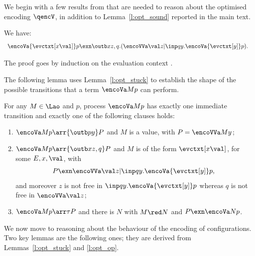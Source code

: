 \DSOCTb


We begin with  a few  results from \cite{DurierHS18,Durier20}
that are needed to reason about the  
optimised encoding $\qencV$, in addition to Lemma~\ref{l:opt_sound}
reported in the main text. 

\DSOCTe


\begin{lemma} 
\label{l:opt_stuck}
We have: 
$$
\begin{array}{rcl}
\encoVa {\evctxt[x\val]} p\exn \outb x {z,q}.(\encoVVa \val z|\inp q
y.\encoVa {\evctxt[y]}p).
\end{array}
 $$ 
\end{lemma}
\noindent
The proof \cite{DurierHS18,Durier20}
goes by induction on the evaluation context \evctxt.



The following lemma \cite{DurierHS18,Durier20}
uses Lemma~\ref{l:opt_stuck}  
to establish the shape of the possible transitions that a term 
$\encoVa M p $ can perform. 


\begin{lemma}
\label{l:opt_op}
For any
  $M\in\Lao$ and  $p$, process  $\encoVa M p$ has exactly
  one immediate transition and exactly one of the following clauses holds:
\begin{enumerate}
\item $\encoVa M p\arr{\outb py}P$  %
and $M$ is a value, with $P=\encoVVa M y$; %
\item $\encoVa M p\arr{\outb x {z,q}} P$  and %
 $M $ is of the form $\evctxt[x\val]$, for some $E,x,\val$,  with 
$$P\exn \encoVVa \val z|\inp q y.\encoVa {\evctxt[y]} p ,$$
and moreover $z$ is not free in $\inp q y.\encoVa {\evctxt[y]} p$
whereas $q$  is not free in $\encoVVa \val z$;
\item $\encoVa M p\arr\tau P$ and there is $N$  with $M\red N$ and
  $P\exn \encoVa N p$. 
\end{enumerate}
\end{lemma}
 
\noindent
We now move to reasoning about the behaviour of the encoding of configurations. 
Two key lemmas are the following ones; they are derived from Lemmas~\ref{l:opt_stuck} and
\ref{l:opt_op}.

